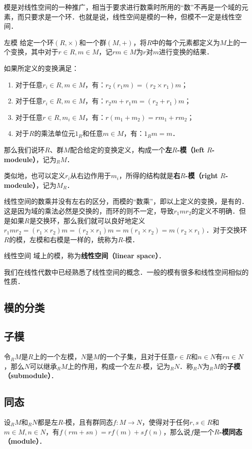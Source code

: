 

模是对线性空间的一种推广，相当于要求进行数乘时所用的“数”不再是一个域的元素，而只要求是一个环．也就是说，线性空间是模的一种，但模不一定是线性空间．

\begin{definition}{左模}
给定一个环$(R, \times)$和一个群$(M, +)$，将$R$中的每个元素都定义为$M$上的一个变换，其中对于$r\in R, m\in M$，记$rm\in M$为$r$对$m$进行变换的结果．

如果所定义的变换满足：
\begin{enumerate}
\item 对于任意$r_i\in R, m\in M$，有：$r_2(r_1m)=(r_2\times r_1)m$；
\item 对于任意$r_i\in R, m\in M$，有：$r_2m+r_1m=(r_2+r_1)m$；
\item 对于任意$r\in R, m_i\in M$，有：$r(m_1+m_2)=rm_1+rm_2$；
\item 对于$R$的乘法单位元$1_R$和任意$m\in M$，有：$1_Rm=m$．
\end{enumerate}

那么我们说环$R$、群$M$配合给定的变换定义，构成一个\textbf{左}$R$\textbf{-模（left} $R$\textbf{-modeule）}，记为$_RM$．
\end{definition}

类似地，也可以定义$r_i$从右边作用于$m_i$，所得的结构就是\textbf{右}$R$\textbf{-模（right} $R$\textbf{-modeule）}，记为$M_R$．

线性空间的数乘并没有左右的区分，而模的“数乘”，即以上定义的变换，是有的．这是因为域的乘法必然是交换的，而环的则不一定，导致$r_1mr_2$的定义不明确．但是如果$R$是交换环，那么我们就可以良好地定义$r_1mr_2=(r_1\times r_2)m=(r_2\times r_1)m=m(r_1\times r_2)=m(r_2\times r_1)$．对于交换环$R$的模，左模和右模是一样的，统称为$R$-模．

\begin{definition}{线性空间}
域上的模，称为\textbf{线性空间（linear space）}．
\end{definition}

我们在线性代数中已经熟悉了线性空间的概念．一般的模有很多和线性空间相似的性质．

\subsection{模的分类}



\subsection{子模}

令$_RM$是$R$上的一个左模，$N$是$M$的一个子集，且对于任意$r\in R$和$n\in N$有$rn\in N$，那么$N$可以继承$_RM$上的作用，构成一个左$R$-模，记为$_RN$．称$_RN$为$_RM$的\textbf{子模（submodule）}．


\subsection{同态}

设$_RM$和$_RN$都是左$R$-模，且有群同态$f:M\to N$，使得对于任何$r, s\in R$和$m\in M, n\in N$，有$f(rm+sn)=rf(m)+sf(n)$，那么说$f$是一个$R$\textbf{-模同态（module）}．











